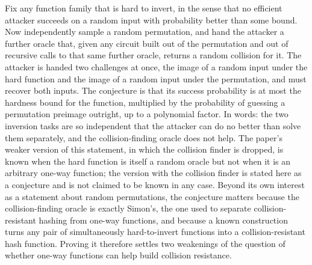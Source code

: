 \documentclass{aicr-conjecture}
\begin{document}

\vspace{0.4em}

\begin{informalconjecture}
Fix any function family that is hard to invert, in the sense that no
efficient attacker succeeds on a random input with probability better
than some bound. Now independently sample a random permutation, and hand
the attacker a further oracle that, given any circuit built out of the
permutation and out of recursive calls to that same further oracle,
returns a random collision for it. The attacker is handed two challenges
at once, the image of a random input under the hard function and the
image of a random input under the permutation, and must recover both
inputs. The conjecture is that its success probability is at most the
hardness bound for the function, multiplied by the probability of
guessing a permutation preimage outright, up to a polynomial factor. In
words: the two inversion tasks are so independent that the attacker can
do no better than solve them separately, and the collision-finding
oracle does not help. The paper's weaker version of this statement, in
which the collision finder is dropped, is known when the hard function
is itself a random oracle but not when it is an arbitrary one-way
function; the version with the collision finder is stated here as a
conjecture and is not claimed to be known in any case. Beyond its own
interest as a statement about random permutations, the conjecture
matters because the collision-finding oracle is exactly Simon's, the one
used to separate collision-resistant hashing from one-way functions, and
because a known construction turns any pair of simultaneously
hard-to-invert functions into a collision-resistant hash function.
Proving it therefore settles two weakenings of the question of whether
one-way functions can help build collision resistance.
\end{informalconjecture}
\end{document}
